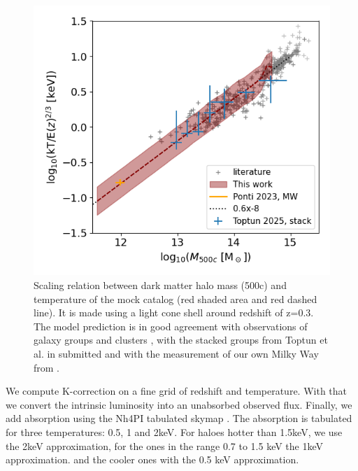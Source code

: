 \documentclass[twocolumn,iop]{openjournal}
\begin{document}
\begin{figure}
    \centering
    \includegraphics[width=0.95\linewidth]{figures_GAS/M500-kt.png}
    \caption{Scaling relation between dark matter halo mass (500c) and temperature of the mock catalog (red shaded area and red dashed line). 
    It is made using a light cone shell around redshift of z=0.3. 
    The model prediction is in good agreement with observations of galaxy groups and clusters \citep{LovisariReiprichSchellenberger_2015A&A...573A.118L, MantzAllenMorris_2016MNRAS.456.4020M, AdamiGilesKoulouridis_2018A&A...620A...5A,BulbulChiuMohr_2019ApJ...871...50B,LovisariSchellenbergerSereno_2020ApJ...892..102L}, with the stacked groups from Toptun et al. in submitted and with the measurement of our own Milky Way from \citep{PontiZhengLocatelli_2023A&A...674A.195P}.
}
    \label{fig:scaling:mass:temperature}
\end{figure}



We compute K-correction on a fine grid of redshift and temperature. With that we convert the intrinsic luminosity into an unabsorbed observed flux. Finally, we add absorption using the Nh4PI tabulated skymap \citep{HI4PICollaborationBenBekhtiFloer_2016A&A...594A.116H}. The absorption is tabulated for three temperatures: 0.5, 1 and 2keV. For haloes hotter than 1.5keV, we use the 2keV approximation, for the ones in the range 0.7 to 1.5 keV the 1keV approximation. and the cooler ones with the 0.5 keV approximation. 
\end{document}
